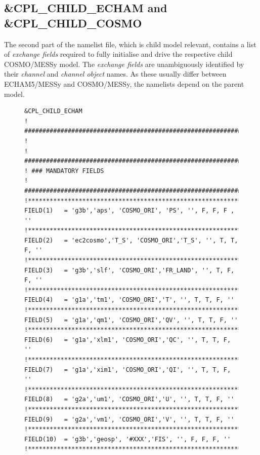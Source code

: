 \documentclass[11pt,twoside]{article}
\newcommand{\blockcode}{\ttfamily\color{OliveGreen}\par}
\begin{document}
\subsection{\protect\&CPL\_CHILD\_ECHAM and \&CPL\_CHILD\_COSMO}\label{sec:nmlcplchildEorC}
The second part of the namelist file, which is child model relevant, contains a list of {\it exchange fields} 
required to fully initialise and drive the respective child COSMO/MESSy model. 
The {\it exchange fields} are unambiguously identified by their 
{\it channel} and {\it channel object} names.
 As these usually differ between ECHAM5/MESSy and COSMO/MESSy, 
the namelists depend on the parent model.
\begin{figure}
\footnotesize
{\blockcode
\begin{verbatim} 
&CPL_CHILD_ECHAM
! ###############################################################################
!
! ###############################################################################
! ### MANDATORY FIELDS
! ###############################################################################
!********************************************************************************
FIELD(1)   = 'g3b','aps', 'COSMO_ORI', 'PS', '', F, F, F , ''     
!********************************************************************************
FIELD(2)   = 'ec2cosmo','T_S', 'COSMO_ORI','T_S', '', T, T, F, ''
!********************************************************************************
FIELD(3)   = 'g3b','slf', 'COSMO_ORI','FR_LAND', '', T, F, F, '' 
!********************************************************************************
FIELD(4)   = 'g1a','tm1', 'COSMO_ORI','T', '', T, T, F, ''      
!********************************************************************************
FIELD(5)   = 'g1a','qm1', 'COSMO_ORI','QV', '', T, T, F, ''     
!********************************************************************************
FIELD(6)   = 'g1a','xlm1', 'COSMO_ORI','QC', '', T, T, F, ''    
!********************************************************************************
FIELD(7)   = 'g1a','xim1', 'COSMO_ORI','QI', '', T, T, F, ''    
!********************************************************************************
FIELD(8)   = 'g2a','um1', 'COSMO_ORI','U', '', T, T, F, ''      
!********************************************************************************
FIELD(9)   = 'g2a','vm1', 'COSMO_ORI','V', '', T, T, F, ''     
!********************************************************************************
FIELD(10)  = 'g3b','geosp', '#XXX','FIS', '', F, F, F, ''       
!********************************************************************************

\end{verbatim}}
\end{figure}
\end{document}
